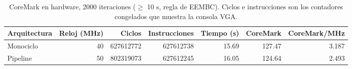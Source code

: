 \begin{table}[htbp]
\centering
\caption{CoreMark en hardware, 2000 iteraciones ($\geq$ 10 s, regla de EEMBC). Ciclos e instrucciones son los contadores congelados que muestra la consola VGA.}
\label{tab:coremark}
\begin{tabular}{lrrrrrr}
\toprule
Arquitectura & Reloj (MHz) & Ciclos & Instrucciones & Tiempo (s) & CoreMark & CoreMark/MHz \\
\midrule
Monociclo & 40 & 627612772 & 627612738 & 15.69 & 127.47 & 3.187 \\
Pipeline & 50 & 802319073 & 627612245 & 16.05 & 124.64 & 2.493 \\
\bottomrule
\end{tabular}
\end{table}
